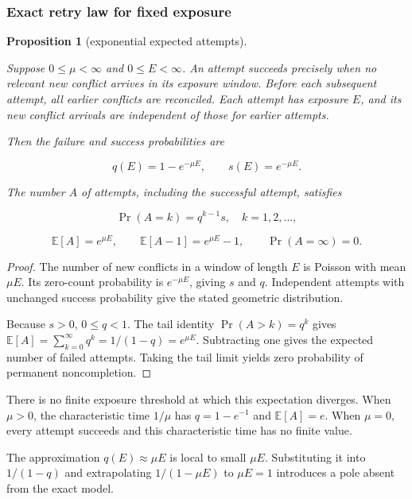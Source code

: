 \documentclass[pdflatex,sn-mathphys-ay]{sn-jnl}
\theoremstyle{thmstyleone}
\newtheorem{proposition}[theorem]{Proposition}
\theoremstyle{thmstylethree}
\begin{document}
\begin{appendices}
\subsubsection{Exact retry law for fixed exposure}\label{app:fixed-exposure}

\begin{proposition}[exponential expected attempts]\label{prop:expected-attempts}

Suppose \(0\le\mu<\infty\) and \(0\le E<\infty\). An attempt succeeds precisely when no relevant new conflict arrives in its exposure window. Before each subsequent attempt, all earlier conflicts are reconciled. Each attempt has exposure \(E\), and its new conflict arrivals are independent of those for earlier attempts.

Then the failure and success probabilities are

\[
q(E)=1-e^{-\mu E},
\qquad s(E)=e^{-\mu E}.
\]

The number \(A\) of attempts, including the successful attempt, satisfies

\[
\Pr(A=k)=q^{k-1}s,\quad k=1,2,\ldots,
\]

\[
\mathbb E[A]=e^{\mu E},
\qquad
\mathbb E[A-1]=e^{\mu E}-1,
\qquad
\Pr(A=\infty)=0.
\]

\end{proposition}
\begin{proof}

The number of new conflicts in a window of length \(E\) is Poisson with mean \(\mu E\). Its zero-count probability is \(e^{-\mu E}\), giving \(s\) and \(q\). Independent attempts with unchanged success probability give the stated geometric distribution.

Because \(s>0\), \(0\le q<1\). The tail identity \(\Pr(A>k)=q^k\) gives \(\mathbb E[A]=\sum_{k=0}^\infty q^k=1/(1-q)=e^{\mu E}\). Subtracting one gives the expected number of failed attempts. Taking the tail limit yields zero probability of permanent noncompletion.

\end{proof}

There is no finite exposure threshold at which this expectation diverges. When \(\mu>0\), the characteristic time \(1/\mu\) has \(q=1-e^{-1}\) and \(\mathbb E[A]=e\). When \(\mu=0\), every attempt succeeds and this characteristic time has no finite value.

The approximation \(q(E)\approx\mu E\) is local to small \(\mu E\). Substituting it into \(1/(1-q)\) and extrapolating \(1/(1-\mu E)\) to \(\mu E=1\) introduces a pole absent from the exact model.


\end{appendices}
\end{document}
